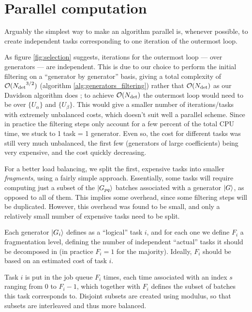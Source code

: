 \documentclass[./thesis.tex]{subfiles}
\begin{document}
\section{Parallel computation}

Arguably the simplest way to make an algorithm parallel is, whenever possible, to create independent tasks corresponding to one iteration of the outermost loop. 

As figure \ref{fig:selection} suggests, iterations for the outermost loop --- over generators --- are independent. This is due to our choice to perform the initial filtering on a ``generator by generator'' basis, giving a total complexity of $\mathcal{O}({N_\text{det}}^{3/2})$ (algorithm \ref{alg:generators_filtering}) rather that $\mathcal{O}({N_\text{det}})$ as our Davidson algorithm does ; to achieve $\mathcal{O}({N_\text{det}})$ the outermost loop would need to be over $\{U_\alpha\}$ and $\{U_\beta\}$. This would give a smaller number of iterations/tasks with extremely unbalanced costs, which doesn't suit well a parallel scheme. Since in practice the filtering steps only account for a few percent of the total CPU time, we stuck to 1 task = 1 generator. Even so, the cost for different tasks was still very much unbalanced, the first few (generators of large coefficients) being very expensive, and the cost quickly decreasing.

For a better load balancing, we split the first, expensive tasks into smaller \emph{fragments}, using a fairly simple approach. Essentially, some tasks will require computing just a subset of the $\ket {G_{pq}}$ batches associated with a generator $\ket G$, as opposed to all of them. This implies some overhead, since some filtering steps will be duplicated. However, this overhead was found to be small, and only a relatively small number of expensive tasks need to be split.



Each generator $\ket {G_i}$ defines as a ``logical'' task $i$, and for each one we define $F_i$ a fragmentation level, defining the number of independent ``actual'' tasks it should be decomposed in (in practice $F_i = 1$ for the majority). Ideally, $F_i$ should be based on an estimated cost of task $i$. 

Task $i$ is put in the job queue $F_i$ times, each time associated with an index $s$ ranging from $0$ to $F_i-1$, which together with $F_i$ defines the subset of batches this task corresponds to. Disjoint subsets are created using modulus, so that subsets are interleaved and thus more balanced.
 
\end{document}
